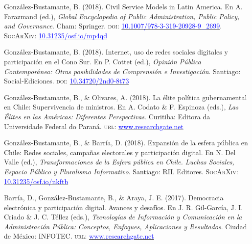 \begin{publications}

\begin{benumerate}{12}

\item{\small González-Bustamante, B. (2018). Civil Service Models in Latin America. En A. Farazmand (ed.), {\itshape Global Encyclopedia of Public Administration, Public Policy, and Governance}. Cham: Springer. {\scshape doi}: \href{https://doi.org/10.1007/978-3-319-20928-9\_2699}{\textcolor{blue}{10.1007/978-3-319-20928-9\_2699}}. {\scshape \footnotesize SocArXiv}: \href{https://doi.org/10.31235/osf.io/mp4qd}{\textcolor{blue}{10.31235/osf.io/mp4qd}}}\vspace{1mm}

\item{\small González-Bustamante, B. (2018). Internet, uso de redes sociales digitales y participación en el Cono Sur. En P. Cottet (ed.), {\itshape Opini\'on P\'ublica Contempor\'anea: Otras posibilidades de Comprensi\'on e Investigaci\'on}. Santiago: Social-Ediciones. {\scshape doi}: \href{https://doi.org/10.34720/2nd0-8t73}{\textcolor{blue}{10.34720/2nd0-8t73}}}\vspace{1mm}

\item{\small González-Bustamante, B., \& Olivares, A. (2018). La élite política gubernamental en Chile: Supervivencia de ministros. En A. Codato \& F. Espinoza (eds.), {\itshape Las \'Elites en las Am\'ericas: Diferentes Perspectivas}. Curitiba: Editora da Universidade Federal do Paraná. {\scshape url}: \href{https://www.researchgate.net/publication/325699783_Elites_en_las_Americas_diferentes_perspectivas_Elites_in_the_Americas_Different_Perspectives}{\textcolor{blue}{www.researchgate.net}}}\vspace{1mm}

\item{\small González-Bustamante, B., \& Barría, D. (2018). Expansión de la esfera pública en Chile: Redes sociales, campañas electorales y participación digital. En N. Del Valle (ed.), {\itshape Transformaciones de la Esfera p\'ublica en Chile. Luchas Sociales, Espacio P\'ublico y Pluralismo Informativo}. Santiago: RIL Editores. {\scshape \footnotesize SocArXiv}: \href{https://doi.org/10.31235/osf.io/nkftb}{\textcolor{blue}{10.31235/osf.io/nkftb}}}\vspace{1mm}

\item{\small Barría, D., González-Bustamante, B., \& Araya, J. E. (2017). Democracia electrónica y participación digital. Avances y desafíos. En J. R. Gil-Garc\'ia, J. I. Criado \&  J. C. T\'ellez (eds.), {\itshape Tecnolog\'ias de Informaci\'on y Comunicaci\'on en la Administraci\'on P\'ublica: Conceptos, Enfoques, Aplicaciones y Resultados}. Ciudad de México: INFOTEC. {\scshape url}: \href{https://www.researchgate.net/publication/321980289_Democracia_electronica_y_participacion_digital_Avances_y_desafios}{\textcolor{blue}{www.researchgate.net}}}\vspace{1mm}


\end{benumerate}
\end{publications}
